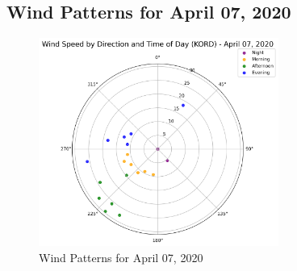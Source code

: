 \subsection{Wind Patterns for April 07, 2020}
\begin{figure}[htbp]
\centering
\includegraphics[width=0.7\textwidth]{wind_radar_plot_20200407.png}
\caption{Wind Patterns for April 07, 2020}
\label{fig:wind_20200407}
\end{figure}

